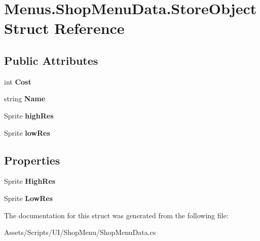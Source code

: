 \hypertarget{struct_menus_1_1_shop_menu_data_1_1_store_object}{}\section{Menus.\+Shop\+Menu\+Data.\+Store\+Object Struct Reference}
\label{struct_menus_1_1_shop_menu_data_1_1_store_object}
\subsection*{Public Attributes}
\begin{DoxyCompactItemize}
\item 
int {\bfseries Cost}\hypertarget{struct_menus_1_1_shop_menu_data_1_1_store_object_a7a7b36b71c978cb11dda711ea66f7eb3}{}\label{struct_menus_1_1_shop_menu_data_1_1_store_object_a7a7b36b71c978cb11dda711ea66f7eb3}

\item 
string {\bfseries Name}\hypertarget{struct_menus_1_1_shop_menu_data_1_1_store_object_ae8a3658a4964a9a67b1de0fbee128869}{}\label{struct_menus_1_1_shop_menu_data_1_1_store_object_ae8a3658a4964a9a67b1de0fbee128869}

\item 
Sprite {\bfseries high\+Res}\hypertarget{struct_menus_1_1_shop_menu_data_1_1_store_object_a42bc123d5f9345129ded4cbd3c5101d9}{}\label{struct_menus_1_1_shop_menu_data_1_1_store_object_a42bc123d5f9345129ded4cbd3c5101d9}

\item 
Sprite {\bfseries low\+Res}\hypertarget{struct_menus_1_1_shop_menu_data_1_1_store_object_afaa2794b9c748ba350fe07a396f1fcd5}{}\label{struct_menus_1_1_shop_menu_data_1_1_store_object_afaa2794b9c748ba350fe07a396f1fcd5}

\end{DoxyCompactItemize}
\subsection*{Properties}
\begin{DoxyCompactItemize}
\item 
Sprite {\bfseries High\+Res}\hypertarget{struct_menus_1_1_shop_menu_data_1_1_store_object_a14be1f6f44cedb1b46260ffe9197f856}{}\label{struct_menus_1_1_shop_menu_data_1_1_store_object_a14be1f6f44cedb1b46260ffe9197f856}

\item 
Sprite {\bfseries Low\+Res}\hypertarget{struct_menus_1_1_shop_menu_data_1_1_store_object_af86650045d1d10d13bb22246b92e0a2e}{}\label{struct_menus_1_1_shop_menu_data_1_1_store_object_af86650045d1d10d13bb22246b92e0a2e}

\end{DoxyCompactItemize}


The documentation for this struct was generated from the following file\+:\begin{DoxyCompactItemize}
\item 
Assets/\+Scripts/\+U\+I/\+Shop\+Menu/Shop\+Menu\+Data.\+cs\end{DoxyCompactItemize}

